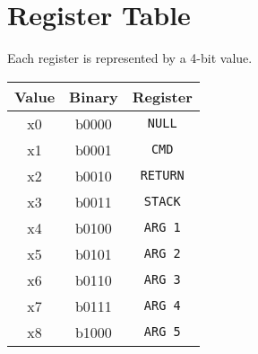 \documentclass[12pt,a4paper]{article}
\begin{document}
\section{Register Table}

Each register is represented by a 4-bit value.

\begin{center}
\begin{tabular}{c c c}
    \textbf{Value} & \textbf{Binary} & \textbf{Register} \\
    \hline

    x0 & b0000 & \texttt{NULL} \\

    \hline

    x1 & b0001 & \texttt{CMD} \\
    x2 & b0010 & \texttt{RETURN} \\
    x3 & b0011 & \texttt{STACK} \\

    \hline

    x4 & b0100 & \texttt{ARG 1} \\
    x5 & b0101 & \texttt{ARG 2} \\
    x6 & b0110 & \texttt{ARG 3} \\
    x7 & b0111 & \texttt{ARG 4} \\
    x8 & b1000 & \texttt{ARG 5} \\
\end{tabular}
\end{center}
\end{document}
